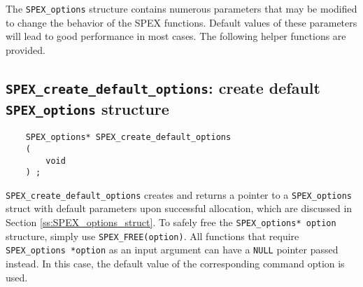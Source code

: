 \documentclass[12pt]{report}
\theoremstyle{definition}
\begin{document}
The \verb|SPEX_options| structure contains numerous parameters that may be
modified to change the behavior of the SPEX functions.  Default values of
these parameters will lead to good performance in most cases. The following helper functions
are provided.




\subsection{\texttt{SPEX\_create\_default\_options}: create default \texttt{SPEX\_options} structure}
\label{ss:create_default_options}

\begin{mdframed}[userdefinedwidth=6in]
{\footnotesize
\begin{verbatim}
    SPEX_options* SPEX_create_default_options
    (
        void
    ) ;
\end{verbatim}
} \end{mdframed}

\verb|SPEX_create_default_options| creates and returns a pointer to a
\verb|SPEX_options| struct with default parameters upon successful allocation,
which are discussed in Section \ref{ss:SPEX_options_struct}.  To safely free
the \verb|SPEX_options* option| structure, simply use \newline \verb|SPEX_FREE(option)|.
All functions that require \verb|SPEX_options *option| as an input argument can
have a \verb'NULL' pointer passed instead. In this case, the default value of
the corresponding command option is used. 
\end{document}
